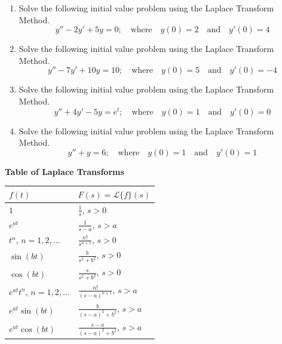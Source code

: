 \begin{enumerate}[resume]
\item Solve the following initial value problem using the Laplace Transform Method. \label{15problem15}
\[
y''-2y'+5y=0; \quad \text{where} \quad y(0)=2 \quad \text{and} \quad y'(0)=4
\]
\newpage
\item Solve the following initial value problem using the Laplace Transform Method. \label{15problem16}
\[
y''-7y'+10y=10; \quad \text{where} \quad y(0)=5 \quad \text{and} \quad y'(0)=-4
\]
\newpage
\item Solve the following initial value problem using the Laplace Transform Method. \label{15problem17}
\[
y''+4y'-5y=e^t; \quad \text{where} \quad y(0)=1 \quad \text{and} \quad y'(0)=0
\]
\newpage
\item Solve the following initial value problem using the Laplace Transform Method. \label{15problem18}
\[
y''+y=6; \quad \text{where} \quad y(0)=1 \quad \text{and} \quad y'(0)=1
\]
\end{enumerate}

\newpage
{}
\textbf{Table of Laplace Transforms} \\
\begin{center}
{\renewcommand{\arraystretch}{2.5}
\begin{tabular}{|l|l|} \hline
\Large{$f(t)$} & \Large{$F(s)=\mathscr{L}\{f\}(s)$} \\ \hline
$1$ & $\displaystyle\frac{1}{s}$, \quad $s>0$ \\ \hline
$e^{at}$ & $\displaystyle\frac{1}{s-a}$, \quad $s>a$ \\ \hline
$t^n$, $n=1, 2, ...$ & $\displaystyle\frac{n!}{s^{n+1}}$, \quad $s>0$ \\ \hline
$\sin(bt)$ & $\displaystyle\frac{b}{s^2+b^2}$, \quad $s>0$ \\ \hline
$\cos(bt)$ & $\displaystyle\frac{s}{s^2+b^2}$, \quad $s>0$ \\ \hline
$e^{at}t^n$, $n=1, 2, ...$ & $\displaystyle\frac{n!}{(s-a)^{n+1}}$, \quad $s>a$ \\ \hline
$e^{at}\sin(bt)$ & $\displaystyle\frac{b}{(s-a)^2+b^2}$, \quad $s>a$ \\ \hline
$e^{at}\cos(bt)$ & $\displaystyle\frac{s-a}{(s-a)^2+b^2}$, \quad $s>a$ \\ \hline
\end{tabular}
}
\end{center}

